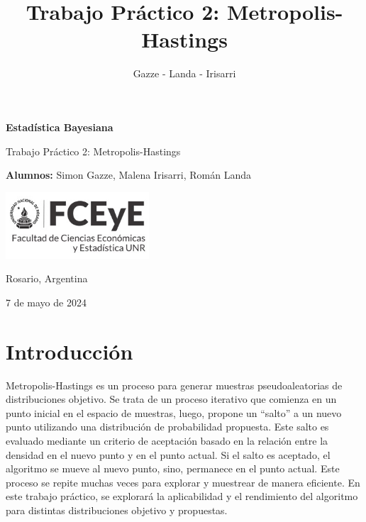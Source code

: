 \documentclass[
]{article}
\title{Trabajo Práctico 2: Metropolis-Hastings}
\author{Gazze - Landa - Irisarri}
\date{}
\begin{document}
\maketitle

\thispagestyle{empty}

\begin{center}
  \vspace*{1cm}

  \Huge
  \textbf{Estadística Bayesiana}

  \vspace{0.5cm}
  \LARGE
  Trabajo Práctico 2: Metropolis-Hastings

  \vspace{1.5cm}

  \textbf{Alumnos:} Simon Gazze, Malena Irisarri, Román Landa\\

  \vfill

  \includegraphics[width=0.4\textwidth]{logo_universidad}

  \vspace{0.8cm}


  Rosario, Argentina

  7 de mayo de 2024
\end{center}

\newpage

\hypertarget{introducciuxf3n}{%
\section{Introducción}\label{introducciuxf3n}}

Metropolis-Hastings es un proceso para generar muestras pseudoaleatorias
de distribuciones objetivo. Se trata de un proceso iterativo que
comienza en un punto inicial en el espacio de muestras, luego, propone
un ``salto'' a un nuevo punto utilizando una distribución de
probabilidad propuesta. Este salto es evaluado mediante un criterio de
aceptación basado en la relación entre la densidad en el nuevo punto y
en el punto actual. Si el salto es aceptado, el algoritmo se mueve al
nuevo punto, sino, permanece en el punto actual. Este proceso se repite
muchas veces para explorar y muestrear de manera eficiente. En este
trabajo práctico, se explorará la aplicabilidad y el rendimiento del
algoritmo para distintas distribuciones objetivo y propuestas.
\end{document}
